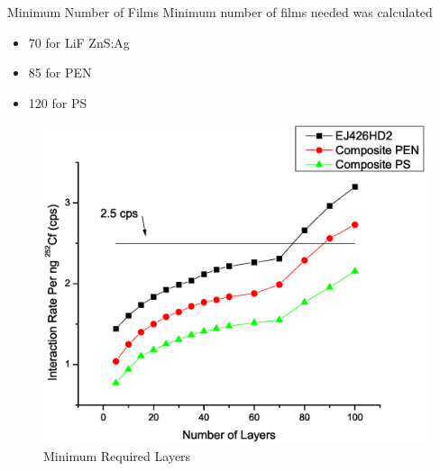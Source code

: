 \begin{frame}{Minimum Number of Films}
	\small
	Minimum number of films needed was calculated
	\tiny
	\begin{itemize}
		\item 70 for LiF ZnS:Ag
		\item 85 for PEN
		\item 120 for PS
	\end{itemize}
	\tiny
	\begin{figure}
		\centering
		\includegraphics[height=0.6\textheight]{images/OptimalDetectorSize.eps}
		\tiny \caption{Minimum Required Layers}
	\end{figure}
\end{frame}
